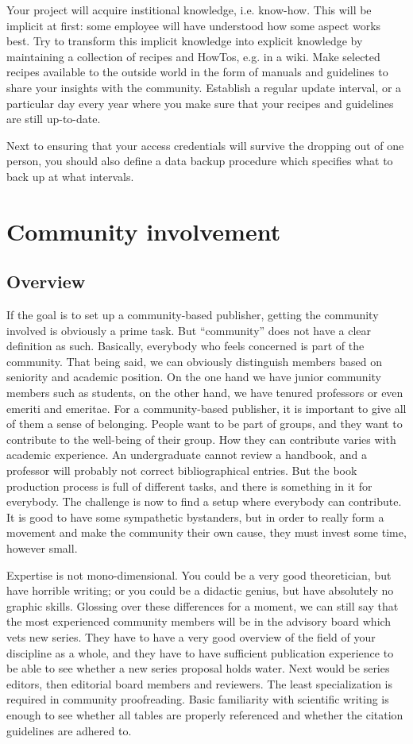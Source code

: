 \documentclass[nonflat,smallfont
]{langsci/langscibook}
\begin{document}
Your project will acquire institional knowledge, i.e. know-how. This will be implicit at first: some employee will have understood how some aspect works best. Try to transform this implicit knowledge into explicit knowledge by maintaining a collection of recipes and HowTos, e.g. in  a wiki. Make selected recipes available to the outside world in the form of manuals and guidelines to share your insights with the community. Establish a regular update interval, or a particular day every year where you make sure that your recipes and guidelines are still up-to-date. 

Next to ensuring that your access credentials will survive the dropping out of one person, you should also define a data backup procedure which specifies what to back up at what intervals. 


\section{Community involvement}\label{sec:community}
\subsection{Overview}
If the goal is to set up a community-based publisher, getting the community involved is obviously a prime task. But ``community'' does not have a clear definition as such. Basically, everybody who feels concerned is part of the community. That being said, we can obviously distinguish members based on seniority and academic position. On the one hand we have junior community members such as students, on the other hand, we have tenured professors or even emeriti and emeritae. For a community-based publisher, it is important to give all of them a sense of belonging.  People want to be part of groups, and they want to contribute to the well-being of their group. How they can contribute varies with academic experience. An undergraduate cannot review a handbook, and a professor will probably not correct bibliographical entries. But the book production process is full of different tasks, and there is something in it for everybody. The challenge is now to find a setup where everybody can contribute. It is good to have some sympathetic bystanders, but in order to really form a movement and make the community their own cause, they must invest some time, however small. 

Expertise is not mono-dimensional. You could be a very good theoretician, but have horrible writing; or you could be a didactic genius, but have absolutely no graphic skills. Glossing over these differences for a moment, we can still say that the most experienced community members will be in the advisory board which vets new series. They have to have a very good overview of the field of your discipline as a whole, and they have to have sufficient publication experience to be able to see whether a new series proposal holds water. Next would be series editors, then editorial board members and reviewers. The least specialization is required in community proofreading. Basic familiarity with scientific writing is enough to see whether all tables are properly referenced and whether the citation guidelines are adhered to. 
\end{document}
